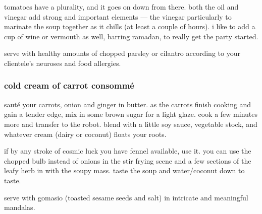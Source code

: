 tomatoes have a plurality, and it goes on down from there. both the
oil and vinegar add strong and important elements --- the vinegar
particularly to marinate the soup together as it chills (at least a
couple of hours). i like to add a cup of wine or vermouth as well,
barring ramadan, to really get the party started.
		
serve with healthy amounts of chopped parsley or cilantro according to
your clientele's neuroses and food allergies.

\subsubsection{cold cream of carrot consomm\'{e}}

saut\'{e} your carrots, onion and ginger in butter. as the carrots
finish cooking and gain a tender edge, mix in some brown sugar for a
light glaze. cook a few minutes more and transfer to the robot. blend
with a little soy sauce, vegetable stock, and whatever cream (dairy or
coconut) floats your roots.

if by any stroke of cosmic luck you have fennel available, use it. you
can use the chopped bulb instead of onions in the stir frying scene
and a few sections of the leafy herb in with the soupy mass. taste the
soup and water/coconut down to taste.

serve with gomasio (toasted sesame seeds and salt) in intricate and
meaningful mandalas.
